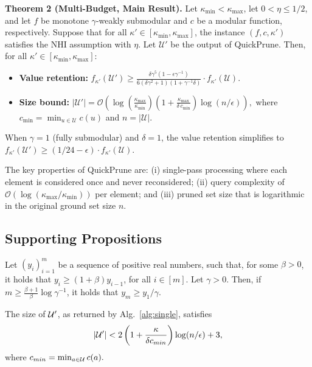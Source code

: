 \textbf{Theorem 2 (Multi-Budget, Main Result).} Let $\kappa_{\min} < \kappa_{\max}$, let
$0 < \eta \leq 1/2$, and let $f$ be monotone $\gamma$-weakly submodular and $c$ be a modular function,
respectively. Suppose that for all $\kappa' \in [\kappa_{\min}, \kappa_{\max}]$, the
instance $(f, c, \kappa')$ satisfies the NHI assumption with $\eta$. Let $\mathcal{U}'$
be the output of QuickPrune. Then, for all
$\kappa' \in [\kappa_{\min}, \kappa_{\max}]$:
\begin{itemize}
  \item \textbf{Value retention:}
    $f_{\kappa'}(\mathcal{U}') \geq
    \frac{\delta \gamma^5 (1 - \epsilon \gamma^{-1})}
    {6(\delta \gamma^2 + 1)(1 + \gamma^{-1} \delta)} \cdot f_{\kappa'}(\mathcal{U}).$
  \item \textbf{Size bound:}
    $|\mathcal{U}'| = \mathcal{O}\!\left(
    \log\!\left(\frac{\kappa_{\max}}{\kappa_{\min}}\right)
    \left(1 + \frac{\kappa_{\max}}{\delta \, c_{\min}}\right)
    \log(n / \epsilon)\right),$
    where $c_{\min} = \min_{u \in \mathcal{U}} c(u)$ and $n = |\mathcal{U}|$.
\end{itemize}
When $\gamma = 1$ (fully submodular) and $\delta = 1$, the value retention simplifies to
$f_{\kappa'}(\mathcal{U}') \geq (1/24 - \epsilon) \cdot f_{\kappa'}(\mathcal{U})$.

The key properties of QuickPrune are: (i) single-pass processing where each element is
considered once and never reconsidered; (ii) query complexity of
$\mathcal{O}(\log(\kappa_{\max} / \kappa_{\min}))$ per element; and (iii) pruned set size
that is logarithmic in the original ground set size $n$.

\subsection{Supporting Propositions}

\begin{fact} \label{fact:1}
  Let $(y_i)_{i=1}^m$ be a sequence of positive real numbers, such that, for some $\beta > 0$, it holds that $y_i \ge (1 + \beta)y_{i-1}$, for all $i \in [m]$. Let $\gamma > 0$. Then, if $m \ge \frac{\beta + 1}{\beta}\log \gamma^{-1} $, it holds that $y_m \ge y_1 / \gamma$.
\end{fact}

\begin{proposition} \label{prop:uprime-size}
  The size of $\mathcal{U}'$, as returned by Alg.~\ref{alg:single}, satisfies
  $$|\mathcal{U}'| < 2 \left( 1 + \frac{\kappa }{\delta c_{min} } \right) \log ( n / \epsilon ) + 3,$$
  where $c_{min} = \min_{a \in \mathcal{U} } c(a).$
\end{proposition}

